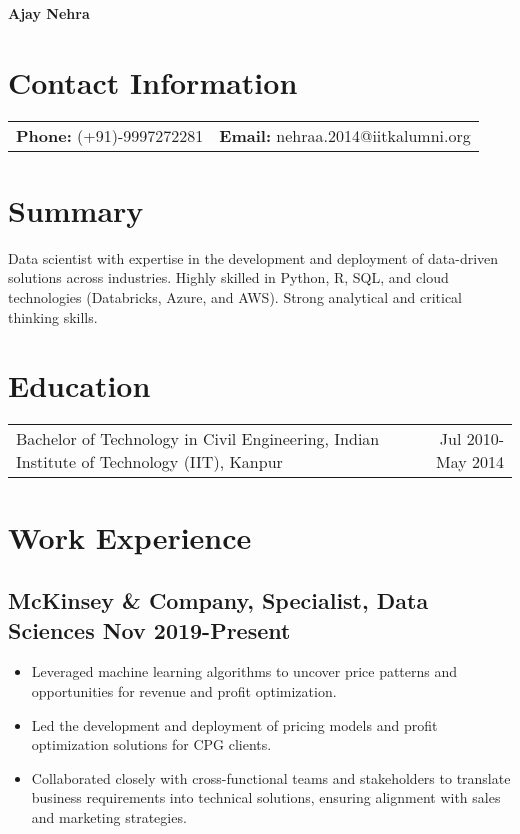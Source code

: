 \documentclass[a4paper,10pt]{article}
\begin{document}
\begin{center}
    \textbf{\Large Ajay Nehra}
\end{center}

\section*{Contact Information}
\begin{tabularx}{\textwidth}{@{}ll}
    \textbf{Phone:} (+91)-9997272281 & \textbf{Email:} nehraa.2014@iitkalumni.org \\
\end{tabularx}

\section*{Summary}
Data scientist with expertise in the development and deployment of data-driven solutions across industries. Highly skilled in Python, R, SQL, and cloud technologies (Databricks, Azure, and AWS). Strong analytical and critical thinking skills.

\section*{Education}
\begin{tabularx}{\textwidth}{@{}Xr}
    Bachelor of Technology in Civil Engineering, Indian Institute of Technology (IIT), Kanpur & Jul 2010- May 2014
\end{tabularx}

\section*{Work Experience}
\subsection*{McKinsey \& Company, Specialist, Data Sciences \hfill Nov 2019-Present}
\begin{itemize}[leftmargin=*]
    \item Leveraged machine learning algorithms to uncover price patterns and opportunities for revenue and profit optimization.
    \item Led the development and deployment of pricing models and profit optimization solutions for CPG clients.
    \item Collaborated closely with cross-functional teams and stakeholders to translate business requirements into technical solutions, ensuring alignment with sales and marketing strategies.
\end{itemize}
\end{document}

